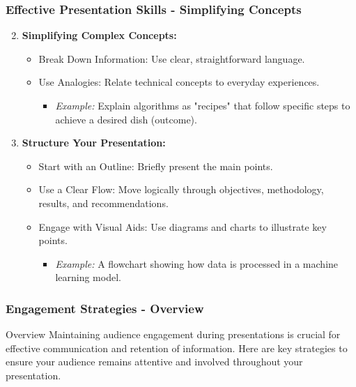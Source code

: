 \documentclass[aspectratio=169]{beamer}
\begin{document}
\begin{frame}[fragile]
    \frametitle{Effective Presentation Skills - Simplifying Concepts}
    \begin{enumerate}
        \setcounter{enumi}{1}
        \item \textbf{Simplifying Complex Concepts:}
        \begin{itemize}
            \item Break Down Information: Use clear, straightforward language.
            \item Use Analogies: Relate technical concepts to everyday experiences.
            \begin{itemize}
                \item \textit{Example:} Explain algorithms as "recipes" that follow specific steps to achieve a desired dish (outcome).
            \end{itemize}
        \end{itemize}

        \item \textbf{Structure Your Presentation:}
        \begin{itemize}
            \item Start with an Outline: Briefly present the main points.
            \item Use a Clear Flow: Move logically through objectives, methodology, results, and recommendations.
            \item Engage with Visual Aids: Use diagrams and charts to illustrate key points.
            \begin{itemize}
                \item \textit{Example:} A flowchart showing how data is processed in a machine learning model.
            \end{itemize}
        \end{itemize}
    \end{enumerate}
\end{frame}

\begin{frame}[fragile]
    \frametitle{Engagement Strategies - Overview}
    \begin{block}{Overview}
        Maintaining audience engagement during presentations is crucial for effective communication and retention of information. Here are key strategies to ensure your audience remains attentive and involved throughout your presentation.
    \end{block}
\end{frame}
\end{document}

